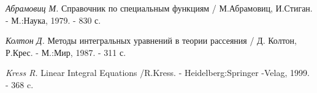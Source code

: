 \documentclass[a4 paper,12pt,ukrainian]{report}
\begin{document}
\renewcommand{\bibname}{Список літератури}
\begin{thebibliography}{99}

\emph{Абрамовиц М.} Справочник по специальным функциям / М.Абрамовиц, И.Стиган. - М.:Наука, 1979. - 830 с.

\emph{Колтон Д.} Методы интегральных уравнений в теории рассеяния / Д. Колтон, Р.Крес. - М.:Мир, 1987. - 311 с.

\emph{Kress R.} Linear Integral Equations /R.Kress. - Heidelberg:Springer -Velag, 1999. - 368 c.

\end{thebibliography}
\end{document}
